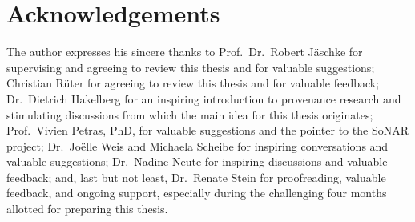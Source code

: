 \section{Acknowledgements}
\label{sec:acks}

The author expresses his sincere thanks to 
Prof.\ Dr.\ Robert Jäschke for supervising and agreeing to review this thesis
and for valuable suggestions; Christian Rüter for agreeing to review this thesis and for valuable feedback;
Dr.\ Dietrich Hakelberg for an inspiring introduction to provenance research
and stimulating discussions from which the main idea for this thesis originates;
%
Prof.\ Vivien Petras, PhD, for valuable suggestions and the pointer to the \gls{SoNAR} project;
%
Dr.\ Joëlle Weis and Michaela Scheibe for inspiring conversations and valuable suggestions;
Dr.\ Nadine Neute for inspiring discussions and valuable feedback;
and, last but not least,
Dr.\ Renate Stein for proofreading, valuable feedback, and ongoing support,
especially during the challenging four months allotted for preparing this thesis.

